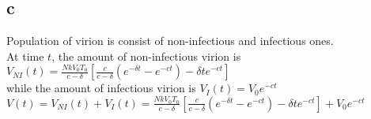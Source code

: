 \documentclass[11pt,letterpaper]{article}
\begin{document}
\subsection*{c}
\noindent Population of virion is consist of non-infectious and infectious ones. \\

\noindent At time $t$, the amount of non-infectious virion is $V_{NI}(t) = \frac{N k V_0 T_0}{c - \delta} [\frac{c}{c - \delta} (e^{-\delta t} - e^{-ct}) - \delta t e^{-ct}]$ \\

\noindent while the amount of infectious virion is $V_{I}(t) = V_0 e^{-ct}$ \\

\noindent $V(t) = V_{NI}(t) + V_I(t) = \frac{N k V_0 T_0}{c - \delta} [\frac{c}{c - \delta} (e^{-\delta t} - e^{-ct}) - \delta t e^{-ct}] + V_0 e^{-ct}$
\end{document}
